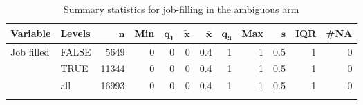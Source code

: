 {\footnotesize
\begin{longtable}{llrrrrrrrrrr}
\caption{Summary statistics for job-filling in the ambiguous arm} \\ 
 \textbf{Variable} & \textbf{Levels} & $\mathbf{n}$ & \textbf{Min} & $\mathbf{q_1}$ & $\mathbf{\widetilde{x}}$ & $\mathbf{\bar{x}}$ & $\mathbf{q_3}$ & \textbf{Max} & $\mathbf{s}$ & \textbf{IQR} & \textbf{\#NA} \\ 
  \hline
Job filled & FALSE &  5649 & 0 & 0 & 0 & 0.4 & 1 & 1 & 0.5 & 1 & 0 \\ 
   & TRUE & 11344 & 0 & 0 & 0 & 0.4 & 1 & 1 & 0.5 & 1 & 0 \\ 
   \hline
 & all & 16993 & 0 & 0 & 0 & 0.4 & 1 & 1 & 0.5 & 1 & 0 \\ 
   \hline
\hline
\label{}
\end{longtable}
}
